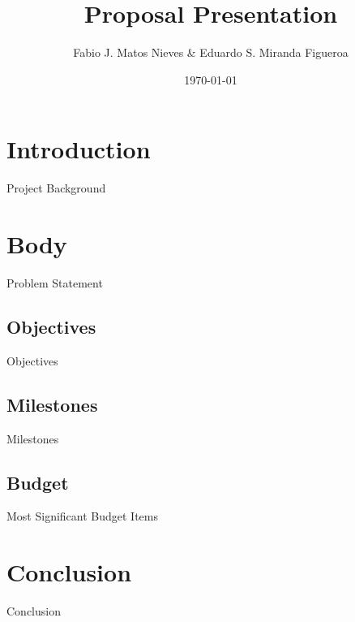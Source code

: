 \documentclass[14pt, aspectratio=169]{beamer}
\title{Proposal Presentation}
\author{Fabio J. Matos Nieves \& Eduardo S. Miranda Figueroa}
\institute{Univerity of Puerto Rico Mayagüez Campus}
\date{\today}
\begin{document}
\maketitle
\begin{frame}
 \tableofcontents 
\end{frame}
\section{Introduction}
\begin{frame}{Project Background}
\end{frame}
\section{Body}
\begin{frame}{Problem Statement}
  
\end{frame}
\subsection{Objectives}
\begin{frame}{Objectives}
  
\end{frame}
\subsection{Milestones}
\begin{frame}{Milestones}
  
\end{frame}
\subsection{Budget}
\begin{frame}{Most Significant Budget Items}
  
\end{frame}
\section{Conclusion}
\begin{frame}{Conclusion}
  
\end{frame}
\end{document}
